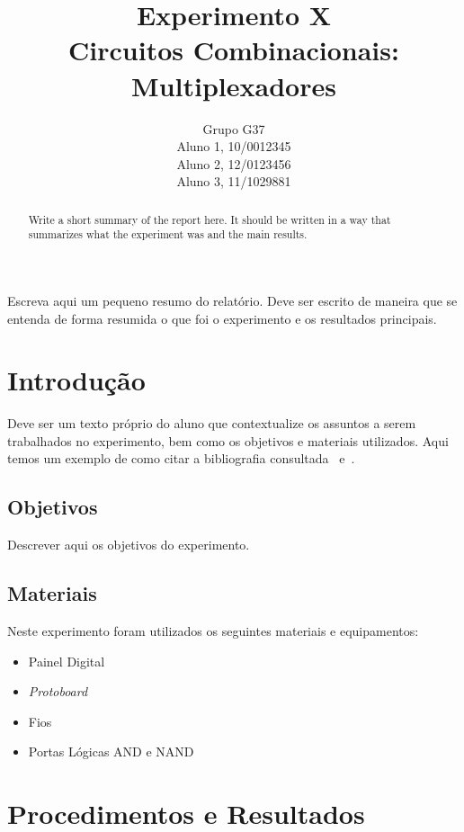 \documentclass[12pt]{article}
\title{Experimento X\\ 
Circuitos Combinacionais: Multiplexadores}
\author{Grupo G37\\    %
        Aluno 1, 10/0012345\\
        Aluno 2,  12/0123456\\
        Aluno 3, 11/1029881\\
}
\begin{document}
 
\maketitle

 \begin{abstract}
Write a short summary of the report here. It should be written in a way that summarizes what the experiment was and the main results.
 \end{abstract}
    
 \begin{resumo} 
  Escreva aqui um pequeno resumo do relatório. Deve ser escrito de maneira que se entenda de forma resumida o que foi o experimento e os resultados principais.
 \end{resumo}


\section{Introdução}
\label{sec:Introducao}

Deve ser um texto próprio do aluno que contextualize os assuntos a serem trabalhados no experimento, bem como os objetivos e materiais utilizados. Aqui temos um exemplo de como citar a bibliografia consultada~\cite{boulic:91} e~\cite{smith:99}.

\subsection{Objetivos}
\label{sec:Objetivos}

Descrever aqui os objetivos do experimento.

\subsection{Materiais} 
\label{sec:Materiais}
Neste experimento foram utilizados os seguintes materiais e equipamentos:
\begin{itemize}
    \item Painel Digital

    \item \textit{Protoboard}
    
    \item Fios
    
    \item Portas Lógicas AND e NAND
\end{itemize}

\section{Procedimentos e Resultados}
\label{sec:Procedimentos}
\end{document}
